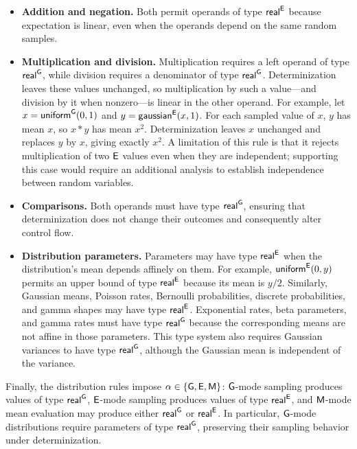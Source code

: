 \begin{itemize}
    \item \textbf{Addition and negation.}
    Both permit operands of type $\mathsf{real}^{\mathsf{E}}$ because expectation is
    linear, even when the operands depend on the same random samples.

    \item \textbf{Multiplication and division.}
    Multiplication requires a left operand of type $\mathsf{real}^{\mathsf{G}}$,
    while division requires a denominator of type $\mathsf{real}^{\mathsf{G}}$.
    Determinization leaves these values unchanged, so multiplication by such a value—and division by it when nonzero—is linear in the other operand.
    For example, let $x=\mathsf{uniform}^{\mathsf{G}}(0,1)$ and $y=\mathsf{gaussian}^{\mathsf{E}}(x,1)$. For each sampled value of $x$, $y$ has mean $x$, so $x*y$ has mean $x^2$. Determinization leaves $x$ unchanged and replaces $y$ by $x$, giving exactly $x^2$. A limitation of this rule is that it rejects multiplication of two $\mathsf{E}$ values even when they are independent; supporting this case would require an additional analysis to establish independence between random variables.

    \item \textbf{Comparisons.}
    Both operands must have type $\mathsf{real}^{\mathsf{G}}$, ensuring that
    determinization does not change their outcomes
    and consequently alter control flow.

    \item \textbf{Distribution parameters.}
    Parameters may have type $\mathsf{real}^{\mathsf{E}}$ when the distribution's
    mean depends affinely on them. For example,
    $\mathsf{uniform}^{\mathsf{E}}(0,y)$ permits an upper bound
    of type $\mathsf{real}^{\mathsf{E}}$ because its mean is $y/2$.
    Similarly, Gaussian means, Poisson rates, Bernoulli
    probabilities, discrete probabilities, and gamma
    shapes may have type $\mathsf{real}^{\mathsf{E}}$. Exponential rates, beta parameters, and gamma rates must have type
    $\mathsf{real}^{\mathsf{G}}$ because the corresponding means are not affine in those
    parameters. This type system also requires Gaussian variances to have
    type $\mathsf{real}^{\mathsf{G}}$, although the Gaussian mean is independent of the variance.
\end{itemize}

Finally, the distribution rules impose $\alpha\in\{\mathsf{G},\mathsf{E},\mathsf{M}\}$:
$\mathsf{G}$-mode sampling produces values of type $\mathsf{real}^{\mathsf{G}}$,
$\mathsf{E}$-mode sampling produces values of type $\mathsf{real}^{\mathsf{E}}$,
and $\mathsf{M}$-mode mean evaluation may produce either $\mathsf{real}^{\mathsf{G}}$ or $\mathsf{real}^{\mathsf{E}}$.
In particular, $\mathsf{G}$-mode distributions require
parameters of type $\mathsf{real}^{\mathsf{G}}$, preserving their sampling
behavior under determinization.

